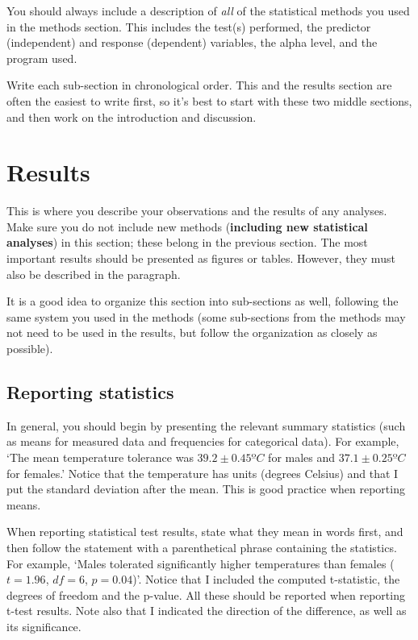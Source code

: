 \documentclass[]{book}
\begin{document}
You should always include a description of \emph{all} of the statistical
methods you used in the methods section. This includes the test(s)
performed, the predictor (independent) and response (dependent)
variables, the alpha level, and the program used.

Write each sub-section in chronological order. This and the results
section are often the easiest to write first, so it's best to start with
these two middle sections, and then work on the introduction and
discussion.

\section{Results}\label{results}

This is where you describe your observations and the results of any
analyses. Make sure you do not include new methods (\textbf{including
new statistical analyses}) in this section; these belong in the previous
section. The most important results should be presented as figures or
tables. However, they must also be described in the paragraph.

It is a good idea to organize this section into sub-sections as well,
following the same system you used in the methods (some sub-sections
from the methods may not need to be used in the results, but follow the
organization as closely as possible).

\subsection{Reporting statistics}\label{reporting-statistics}

In general, you should begin by presenting the relevant summary
statistics (such as means for measured data and frequencies for
categorical data). For example, `The mean temperature tolerance was
\(39.2 \pm 0.45 ºC\) for males and \(37.1 \pm 0.25 ºC\) for females.'
Notice that the temperature has units (degrees Celsius) and that I put
the standard deviation after the mean. This is good practice when
reporting means.

When reporting statistical test results, state what they mean in words
first, and then follow the statement with a parenthetical phrase
containing the statistics. For example, `Males tolerated significantly
higher temperatures than females (\(t = 1.96\), \(df = 6\),
\(p = 0.04\))'. Notice that I included the computed t-statistic, the
degrees of freedom and the p-value. All these should be reported when
reporting t-test results. Note also that I indicated the direction of
the difference, as well as its significance.
\end{document}
